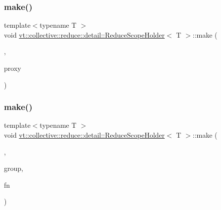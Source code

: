 \mbox{\label{structvt_1_1collective_1_1reduce_1_1detail_1_1_reduce_scope_holder_a0226c973a9bc67754fe5ce3076cb077e}} 
\subsubsection{\texorpdfstring{make()}{make()}\hspace{0.1cm}{\footnotesize\ttfamily [1/2]}}
{\footnotesize\ttfamily template$<$typename T $>$ \\
void \hyperlink{structvt_1_1collective_1_1reduce_1_1detail_1_1_reduce_scope_holder}{vt\+::collective\+::reduce\+::detail\+::\+Reduce\+Scope\+Holder}$<$ T $>$\+::make (\begin{DoxyParamCaption}\item[{\hyperlink{structvt_1_1collective_1_1reduce_1_1detail_1_1_reduce_scope_holder_1_1_obj_group_tag}{Obj\+Group\+Tag}}]{,  }\item[{\hyperlink{namespacevt_ad7cae989df485fccca57f0792a880a8e}{Obj\+Group\+Proxy\+Type}}]{proxy }\end{DoxyParamCaption})}

\mbox{\label{structvt_1_1collective_1_1reduce_1_1detail_1_1_reduce_scope_holder_a47ef025fc658370a2d42680f7c006abb}} 
\subsubsection{\texorpdfstring{make()}{make()}\hspace{0.1cm}{\footnotesize\ttfamily [2/2]}}
{\footnotesize\ttfamily template$<$typename T $>$ \\
void \hyperlink{structvt_1_1collective_1_1reduce_1_1detail_1_1_reduce_scope_holder}{vt\+::collective\+::reduce\+::detail\+::\+Reduce\+Scope\+Holder}$<$ T $>$\+::make (\begin{DoxyParamCaption}\item[{\hyperlink{structvt_1_1collective_1_1reduce_1_1detail_1_1_reduce_scope_holder_1_1_group_tag}{Group\+Tag}}]{,  }\item[{\hyperlink{namespacevt_a27b5e4411c9b6140c49100e050e2f743}{Group\+Type}}]{group,  }\item[{\hyperlink{structvt_1_1collective_1_1reduce_1_1detail_1_1_reduce_scope_holder_ac1bca1874a023b11bdc3c26b165c3b20}{Default\+Create\+Function}}]{fn }\end{DoxyParamCaption})}



